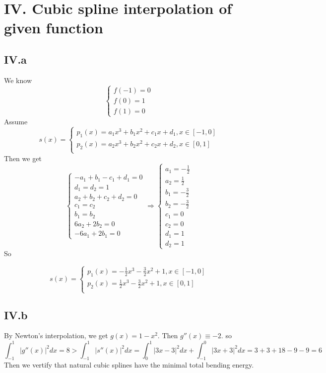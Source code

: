 \documentclass[a4paper]{article}
\begin{document}
\section*{IV. Cubic spline interpolation of given function}
\subsection*{IV.a}
We know 
\[
\begin{cases}
f(-1) = 0 \\
f(0) = 1 \\
f(1) = 0
\end{cases}
\]
Assume 
\[
s(x) = 
\begin{cases}
p_1(x) = a_1 x^3+b_1x^2 + c_1x + d_1 , x\in [-1,0] \\
p_2(x) = a_2 x^3+b_2x^2 + c_2x + d_2 ,x\in [0,1] \\
\end{cases}
\]
Then we get 
\[
\begin{cases}
-a_1 + b_1 - c_1 +d_1 = 0 \\
d_1 = d_2 = 1 \\
a_2 + b_2 + c_2 +d_2= 0 \\
c_1 = c_2 \\
b_1 = b_2 \\
6a_2 + 2b_2 = 0 \\
-6a_1 + 2b_1 = 0
\end{cases}
\Rightarrow
\begin{cases}
a_1 = -\frac{1}{2} \\
a_2 = \frac{1}{2}\\
b_1 = -\frac{3}{2}\\
b_2 = -\frac{3}{2} \\
c_1 = 0 \\
c_2 = 0 \\
d_1 = 1 \\
d_2 = 1
\end{cases}
\]
So 

\[
s(x) = 
\begin{cases}
p_1(x) = -\frac{1}{2} x^3-\frac{3}{2}x^2 + 1 , x\in [-1,0] \\
p_2(x) = \frac{1}{2} x^3-\frac{3}{2}x^2  + 1 ,x\in [0,1] \\
\end{cases}
\]

\subsection*{IV.b}
By Newton's interpolation, we get $g(x) = 1 - x^2$. Then $g''(x) \equiv -2$. so
\[
\int_{-1}^{1}|g''(x)|^2dx = 8 > \int_{-1}^{1}|s''(x)|^2dx =  \int_{0}^{1}|3x-3|^2dx + \int_{-1}^{0}|3x+3|^2dx = 3 + 3 + 18 -9 -9 = 6
\]
Then we vertify that natural cubic splines have the minimal total bending energy.
\end{document}
